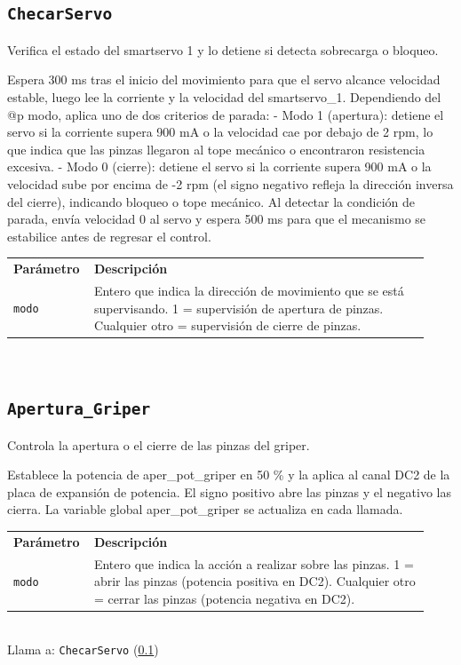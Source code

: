 \subsection{\texttt{ChecarServo}}
\label{fn:ChecarServo}
Verifica el estado del smartservo 1 y lo detiene si detecta sobrecarga o bloqueo.

Espera 300 ms tras el inicio del movimiento para que el servo alcance velocidad estable, luego lee la corriente y la velocidad del smartservo\_1. Dependiendo del @p modo, aplica uno de dos criterios de parada: - Modo 1 (apertura): detiene el servo si la corriente supera 900 mA o la velocidad cae por debajo de 2 rpm, lo que indica que las pinzas llegaron al tope mecánico o encontraron resistencia excesiva. - Modo 0 (cierre): detiene el servo si la corriente supera 900 mA o la velocidad sube por encima de -2 rpm (el signo negativo refleja la dirección inversa del cierre), indicando bloqueo o tope mecánico. Al detectar la condición de parada, envía velocidad 0 al servo y espera 500 ms para que el mecanismo se estabilice antes de regresar el control.

\begin{tabular}{@{}p{0.15\linewidth}p{0.78\linewidth}@{}}
\textbf{Par\'ametro} & \textbf{Descripci\'on} \\
\texttt{modo} & Entero que indica la dirección de movimiento que se está supervisando. 1              = supervisión de apertura de pinzas. Cualquier otro = supervisión de cierre de pinzas. \\
\end{tabular}\\[4pt]

\subsection{\texttt{Apertura\_Griper}}
\label{fn:AperturaGriper}
Controla la apertura o el cierre de las pinzas del griper.

Establece la potencia de aper\_pot\_griper en 50 \% y la aplica al canal DC2 de la placa de expansión de potencia. El signo positivo abre las pinzas y el negativo las cierra. La variable global aper\_pot\_griper se actualiza en cada llamada.

\begin{tabular}{@{}p{0.15\linewidth}p{0.78\linewidth}@{}}
\textbf{Par\'ametro} & \textbf{Descripci\'on} \\
\texttt{modo} & Entero que indica la acción a realizar sobre las pinzas. 1              = abrir las pinzas (potencia positiva en DC2). Cualquier otro = cerrar las pinzas (potencia negativa en DC2). \\
\end{tabular}\\[4pt]
Llama a: \texttt{ChecarServo} (\ref{fn:ChecarServo})\\

